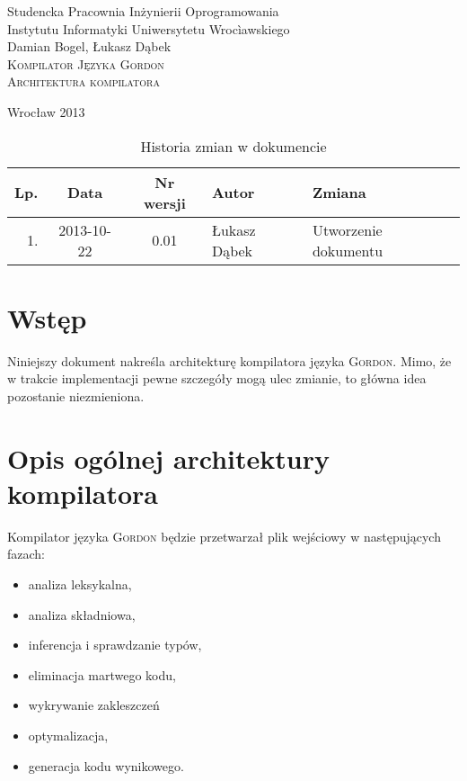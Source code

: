 \documentclass{documentation}
\begin{document}
\begin{titlepage}
\begin{center}
Studencka Pracownia Inżynierii Oprogramowania\\
Instytutu Informatyki Uniwersytetu Wrocìawskiego\\[6cm]

Damian Bogel, Łukasz Dąbek\\[1cm]
\textsc{\LARGE Kompilator Języka Gordon}\\[0.5cm]
\textsc{\large Architektura kompilatora}

\vfill
Wrocław 2013 \\[2.5cm]

\end{center}
\end{titlepage}

\newpage
\begin{table}
	\centering
	\caption{Historia zmian w dokumencie}
		\begin{tabular}{|r|c|c|l|l|}
		\hline
		Lp.  & Data       & Nr wersji & Autor                 & Zmiana \\ \hline
		1.   & 2013-10-22 & 0.01 & Łukasz Dąbek & Utworzenie dokumentu \\ \hline
	\end{tabular}
\end{table}
\newpage

\tableofcontents
\setcounter{page}{2}

\newpage

\section{Wstęp}
\noindent Niniejszy dokument nakreśla architekturę kompilatora języka \textsc{Gordon}. Mimo, że
w trakcie implementacji pewne szczegóły mogą ulec zmianie, to główna idea pozostanie
niezmieniona.

\section{Opis ogólnej architektury kompilatora}
\noindent Kompilator języka \textsc{Gordon} będzie przetwarzał plik wejściowy w następujących fazach:
\begin{itemize}
    \item analiza leksykalna,
    \item analiza składniowa,
    \item inferencja i sprawdzanie typów,
    \item eliminacja martwego kodu,
    \item wykrywanie zakleszczeń
    \item optymalizacja,
    \item generacja kodu wynikowego.
\end{itemize}
\end{document}
